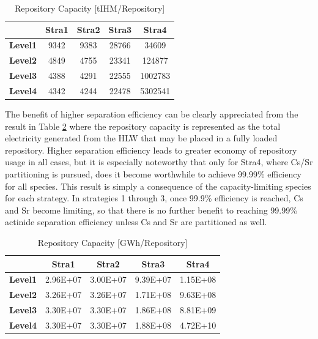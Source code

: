 \begin{table}[htbp]
\begin{center}
\caption{Repository Capacity [tIHM/Repository]}
\label{ses_table15}
\begin{tabular}{|l|c|c|c|c|}
\hline
                & \textbf{Stra1} & \textbf{Stra2} & \textbf{Stra3} & \textbf{Stra4} \\
\hline
\textbf{Level1} & 9342           & 9383           & 28766          & 34609 \\
\textbf{Level2} & 4849           & 4755           & 23341          & 124877 \\
\textbf{Level3} & 4388           & 4291           & 22555          & 1002783 \\
\textbf{Level4} & 4342           & 4244           & 22478          & 5302541 \\
\hline
\end{tabular}
\end{center}
\end{table}



The benefit of higher separation efficiency can be clearly appreciated
from the result in Table \ref{ses_table16} where the repository capacity is represented
as the total electricity generated from the HLW that may be placed in a
fully loaded repository. Higher separation efficiency leads to greater
economy of repository usage in all cases, but it is especially
noteworthy that only for Stra4, where Cs/Sr partitioning is pursued,
does it become worthwhile to achieve 99.99\% efficiency for all species.
 This result is simply a consequence of the capacity-limiting species
for each strategy.  In strategies 1 through 3, once 99.9\% efficiency is
reached, Cs and Sr become limiting, so that there is no further benefit
to reaching 99.99\% actinide separation efficiency unless Cs and Sr are
partitioned as well.  

\begin{table}[htbp]
\begin{center}
\caption{Repository Capacity [GWh/Repository]}
\label{ses_table16}
\begin{tabular}{|l|c|c|c|c|}
\hline
                & \textbf{Stra1} & \textbf{Stra2} & \textbf{Stra3} & \textbf{Stra4} \\
\hline
\textbf{Level1} & 2.96E+07       & 3.00E+07       & 9.39E+07       & 1.15E+08 \\
\textbf{Level2} & 3.26E+07       & 3.26E+07       & 1.71E+08       & 9.63E+08 \\
\textbf{Level3} & 3.30E+07       & 3.30E+07       & 1.86E+08       & 8.81E+09 \\
\textbf{Level4} & 3.30E+07       & 3.30E+07       & 1.88E+08       & 4.72E+10 \\
\hline
\end{tabular}
\end{center}
\end{table}




